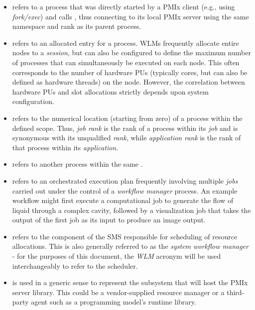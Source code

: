 \begin{itemize}
\item {} refers to a process that was directly started by a \ac{PMIx} client (e.g., using \emph{fork/exec}) and calls , thus connecting to its local \ac{PMIx} server using the same namespace and rank as its parent process.

\item {} refers to an allocated entry for a process. \acp{WLM} frequently allocate entire nodes to a \emph{session}, but can also be configured to define the maximum number of processes that can simultaneously be executed on each node. This often corresponds to the number of hardware \acp{PU} (typically cores, but can also be defined as hardware threads) on the node. However, the correlation between hardware \acp{PU} and slot allocations strictly depends upon system configuration.

\item {} refers to the numerical location (starting from zero) of a process within the defined scope. Thus, \emph{job rank} is the rank of a process within its \emph{job} and is synonymous with its unqualified \emph{rank}, while \emph{application rank} is the rank of that process within its \emph{application}.

\item {} refers to another process within the same .

\item {} refers to an orchestrated execution plan frequently involving multiple \emph{jobs} carried out under the control of a \emph{workflow manager} process. An example workflow might first execute a computational job to generate the flow of liquid through a complex cavity, followed by a visualization job that takes the output of the first job as its input to produce an image output.

\item {} refers to the component of the \ac{SMS} responsible for scheduling of resource allocations. This is also generally referred to as the \emph{system workflow manager} - for the purposes of this document, the \emph{WLM} acronym will be used interchangeably to refer to the scheduler.

\item {} is used in a generic sense to represent the subsystem that will host the \ac{PMIx} server library. This could be a vendor-supplied resource manager or a third-party agent such as a programming model's runtime library.


\end{itemize}
